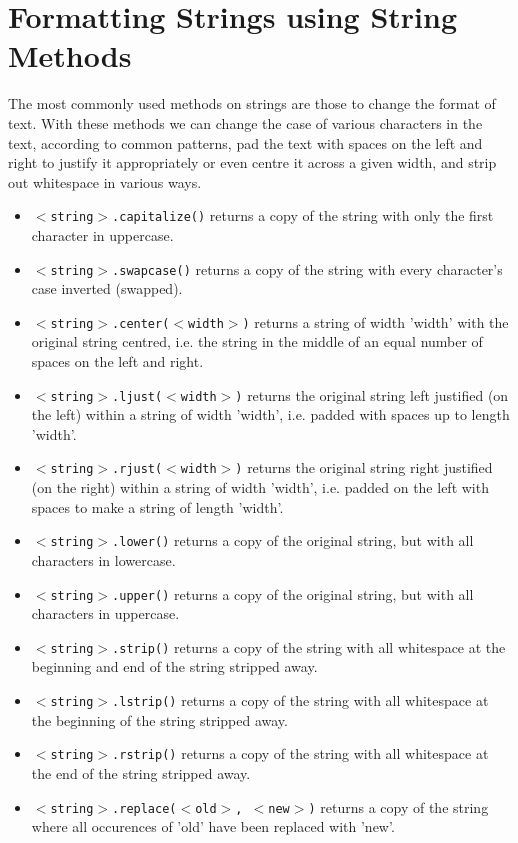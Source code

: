 \section{Formatting Strings using String Methods}

The most commonly used methods on strings are those to change the   format of text. With these methods we can change the case of various   characters in the text, according to common patterns, pad the text with   spaces on the left and right to justify it appropriately or even centre   it across a given width, and strip out whitespace in various ways.
\begin{itemize}
	\item 
\texttt{$<$string$>$.capitalize()} returns a copy of the    string with only the first character in uppercase.
	\item 
\texttt{$<$string$>$.swapcase()} returns a copy of the    string with every character's case inverted (swapped).
	\item 
\texttt{$<$string$>$.center($<$width$>$)} returns a    string of width 'width' with the original string centred, i.e.       the string in the middle of an equal number of spaces on the left       and right.
	\item 
\texttt{$<$string$>$.ljust($<$width$>$)} returns the    original string left justified (on the left) within a string of width 'width',    i.e. padded with spaces up to length 'width'.
	\item 
\texttt{$<$string$>$.rjust($<$width$>$)} returns the    original string right justified (on the right) within a string of width 'width',    i.e. padded on the left with spaces to make a string of length    'width'.
	\item 
\texttt{$<$string$>$.lower()} returns a copy of the    original string, but with all characters in lowercase.
	\item 
\texttt{$<$string$>$.upper()} returns a copy of the    original string, but with all characters in uppercase.
	\item 
\texttt{$<$string$>$.strip()} returns a copy of the    string with all whitespace at the beginning and end of the string    stripped away.
	\item 
\texttt{$<$string$>$.lstrip()} returns a copy of the    string with all whitespace at the beginning of the string stripped    away.
	\item 
\texttt{$<$string$>$.rstrip()} returns a copy of the    string with all whitespace at the end of the string stripped    away.
	\item 
\texttt{$<$string$>$.replace($<$old$>$, $<$new$>$)}    returns a copy of the string where all occurences of 'old'       have been replaced with 'new'.
\end{itemize}
